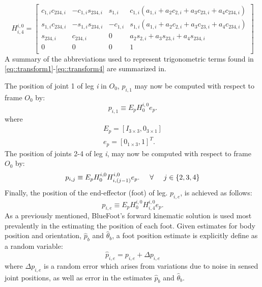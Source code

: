 				\begin{equation}
					H^{i,0}_{i,4} =\left[ 
					\begin{array}{ccc|c}
						c_{1,i} c_{234,i}	&  		-c_{1,i} s_{234,i}	& 		s_{1,i}		&		c_{1,i}( a_{1,i} + a_2 c_{2,i} + a_3 c_{23,i} + a_4 c_{234,i} )		\\
						s_{1,i} c_{234,i}	&  		-s_{1,i} s_{234,i}	& 		-c_{1,i}	&		s_{1,i}( a_{1,i} + a_2 c_{2,i} + a_3 c_{23,i} + a_4 c_{234,i} )		\\
						s_{234,i} 		&  		c_{234,i}		& 		0			&		a_2 s_{2,i} + a_3 s_{23,i} + a_4 s_{234,i}					\\ \hline
						0 			& 		0			& 		0			&		1 															\\
					\end{array} 
					\right]
					\label{eq::transform4}
				\end{equation}
			A summary of the abbreviations used to represent trigonometric terms found in \ref{eq::transform1}-\ref{eq::transform4} are summarized in.

			The position of joint 1 of leg \emph{i} in $O_{0}$, ${p}_{i,1}$ may now be computed with respect to frame $O_{0}$ by:
				\begin{equation}
					{p}_{i,1} \equiv E_{p} H_{0}^{i,0} e_{p}.
					\label{eq::world_joint1_position}
				\end{equation}
			where
				\begin{eqnarray}
					E_{p} = [I_{3\times3},0_{3\times1}]	\nonumber 	\\
					e_{p} = [0_{1\times3},1]^T.			\nonumber 	
				\end{eqnarray}
			The position of joints 2-4 of leg \emph{i}, may now be computed with respect to frame $O_{0}$ by:
				\begin{equation}
					{p}_{i,j} \equiv E_{p} H_{0}^{i,0} {H}^{i,0}_{i,(j-1)} e_{p}. \hspace{5mm} \forall \hspace{5mm} j\in\{2,3,4\}
					\label{eq::world_joint_positions}
				\end{equation}
			Finally, the position of the end-effector (foot) of \Ith leg. ${p}_{i,e}$, is achieved as follows:
				\begin{equation}
					{p}_{i,e} \equiv E_{p} H_{0}^{i,0} {H}^{i,0}_{i,4} e_{p}.
					\label{eq::world_feet_positions}
				\end{equation}
			As a previously mentioned, BlueFoot's forward kinematic solution is used most prevalently in the estimating the position of each foot. Given estimates for body position and orientation, $\hat{p}_{b}$ and $\hat{\theta}_{b}$, a foot position estimate is explicitly define as a random variable:
				\begin{equation}
					\hat{p}_{i,e} = {p}_{i,e} + \Delta {p}_{i,e}
					\label{eq::foot_position_esitmate}
				\end{equation}
			where $\Delta {p}_{i,e}$ is a random error which arises from variations due to noise in sensed joint positions, as well as error in the estimates $\hat{p}_{b}$ and $\hat{\theta}_{b}$.


